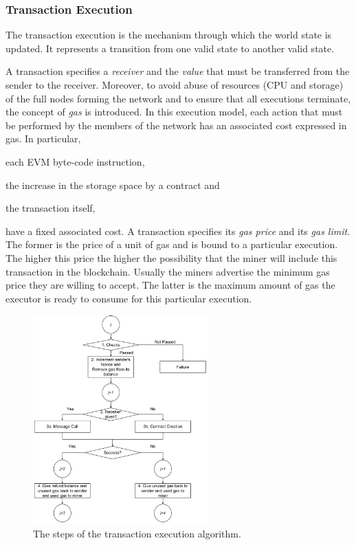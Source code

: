 \subsubsection{Transaction Execution}
\label{sec:tx-execution}

The transaction execution is the mechanism through which the world state is
updated. It represents a transition from one valid state to another valid state.

A transaction specifies a \emph{receiver} and the \emph{value} that must be
transferred from the sender to the receiver. Moreover, to avoid abuse of
resources (CPU and storage) of the full nodes forming the network and to ensure
that all executions terminate, the concept of \emph{gas} is introduced. In this
execution model, each action that must be performed by the members of the network
has an associated cost expressed in gas. In particular,
\begin{enumerate*}[label=(\arabic*)]
	\item each EVM byte-code instruction,
	\item the increase in the storage space by a contract and
	\item the transaction itself,
\end{enumerate*}
have a fixed associated cost. A transaction specifies its \emph{gas
price} and its \emph{gas limit}. The former is the price of a unit of gas and is
bound to a particular execution. The higher this price the higher the
possibility that the miner will include this transaction in the blockchain.
Usually the miners advertise the minimum gas price they are willing to accept.
The latter is the maximum amount of gas the executor is ready to consume for
this particular execution.

\begin{figure}[h!]
	\begin{center}
		\includegraphics[width=0.60\textwidth]{./res/img/transaction-execution.pdf}
	\end{center}
	\caption{The steps of the transaction execution algorithm.}
	\label{fig:tx:execution}
\end{figure}

